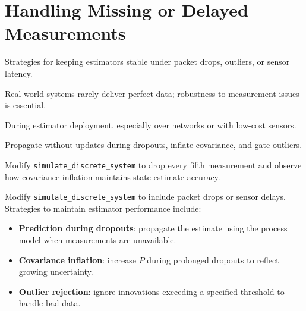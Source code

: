\section{Handling Missing or Delayed Measurements}
\begin{beginnerguide}
    \item[\textbf{What?}] Strategies for keeping estimators stable under packet drops, outliers, or sensor latency.
    \item[\textbf{Why?}] Real-world systems rarely deliver perfect data; robustness to measurement issues is essential.
    \item[\textbf{When?}] During estimator deployment, especially over networks or with low-cost sensors.
    \item[\textbf{How?}] Propagate without updates during dropouts, inflate covariance, and gate outliers.
    \item[\textbf{Example}] Modify \texttt{simulate\_discrete\_system} to drop every fifth measurement and observe how covariance inflation maintains state estimate accuracy.
\end{beginnerguide}
Modify \texttt{simulate\_discrete\_system} to include packet drops or sensor delays. Strategies to maintain estimator performance include:
\begin{itemize}[leftmargin=*]
    \item \textbf{Prediction during dropouts}: propagate the estimate using the process model when measurements are unavailable.
    \item \textbf{Covariance inflation}: increase $P$ during prolonged dropouts to reflect growing uncertainty.
    \item \textbf{Outlier rejection}: ignore innovations exceeding a specified threshold to handle bad data.
\end{itemize}

